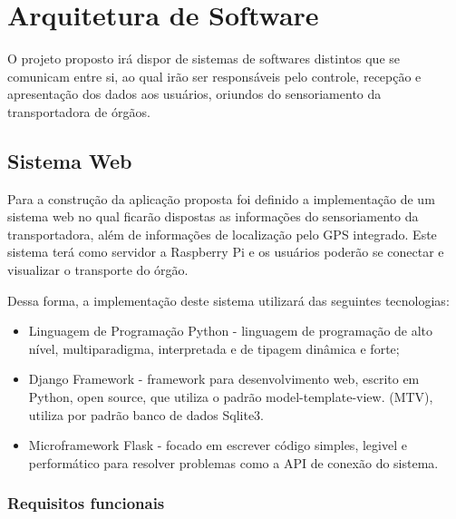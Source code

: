 \section{Arquitetura de Software}
O projeto proposto irá dispor de sistemas de softwares distintos que se comunicam entre si, ao qual irão ser responsáveis pelo controle, recepção e apresentação dos dados aos usuários, oriundos do sensoriamento da transportadora de órgãos.

		\subsection{Sistema Web}
		
		Para a construção da aplicação proposta foi definido a implementação de um sistema web no qual ficarão dispostas as informações do sensoriamento da transportadora, além de informações de localização pelo GPS integrado. Este sistema terá como servidor a Raspberry Pi e os usuários poderão se conectar e visualizar o transporte do órgão.
		
		Dessa forma, a implementação deste sistema utilizará das seguintes tecnologias:
		\begin{itemize}
			\item Linguagem de Programação Python - linguagem de programação de alto nível, multiparadigma, interpretada e de tipagem dinâmica e forte;
		    \item  Django Framework - framework para desenvolvimento web, escrito em Python, open source, que utiliza o padrão model-template-view. (MTV), utiliza por padrão banco de dados Sqlite3.
		    \item Microframework Flask - focado em escrever código simples, legivel e performático para resolver problemas como a API de conexão do sistema.
		\end{itemize}

\subsubsection{Requisitos funcionais}

